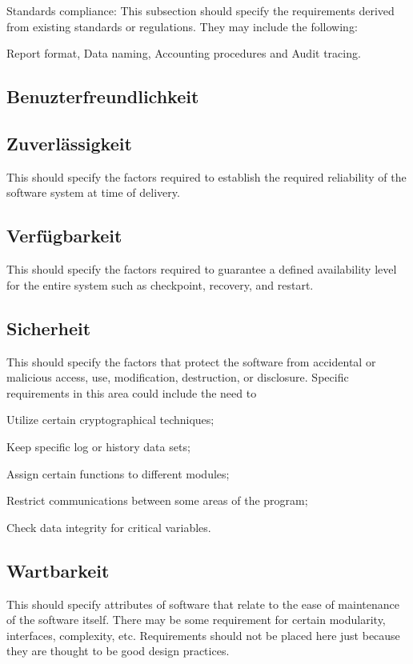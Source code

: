 		Standards compliance: This subsection should specify the requirements derived from existing standards or regulations. They may include the following: 
		
		Report format, Data naming, Accounting procedures and Audit tracing.
	
	\subsection{Benuzterfreundlichkeit}

	\subsection{Zuverlässigkeit}
		This should specify the factors required to establish the required reliability of the software system at time of delivery.
	
	\subsection{Verfügbarkeit}
		This should specify the factors required to guarantee a defined availability level for the entire system such as checkpoint, recovery, and restart. 
	
	\subsection{Sicherheit}
		This should specify the factors that protect the software from accidental or malicious access, use, modification, destruction, or disclosure. Specific requirements in this area could include the need to
		
		Utilize certain cryptographical techniques; 
		
		Keep specific log or history data sets;
		
		Assign certain functions to different modules;
		
		Restrict communications between some areas of the program;
		
		Check data integrity for critical variables.
	
	\subsection{Wartbarkeit}
		This should specify attributes of software that relate to the ease of maintenance of the software itself. There may be some requirement for certain modularity, interfaces, complexity, etc. Requirements should not be placed here just because they are thought to be good design practices.
	
